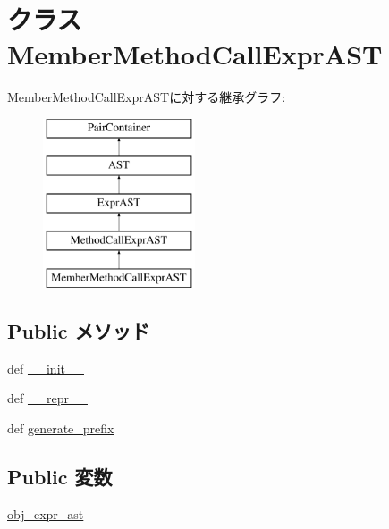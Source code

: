 \hypertarget{classslicc_1_1ast_1_1MethodCallExprAST_1_1MemberMethodCallExprAST}{
\section{クラス MemberMethodCallExprAST}
\label{classslicc_1_1ast_1_1MethodCallExprAST_1_1MemberMethodCallExprAST}
}
MemberMethodCallExprASTに対する継承グラフ:\begin{figure}[H]
\begin{center}
\leavevmode
\includegraphics[height=5cm]{classslicc_1_1ast_1_1MethodCallExprAST_1_1MemberMethodCallExprAST}
\end{center}
\end{figure}
\subsection*{Public メソッド}
\begin{DoxyCompactItemize}
\item 
def \hyperlink{classslicc_1_1ast_1_1MethodCallExprAST_1_1MemberMethodCallExprAST_ac775ee34451fdfa742b318538164070e}{\_\-\_\-init\_\-\_\-}
\item 
def \hyperlink{classslicc_1_1ast_1_1MethodCallExprAST_1_1MemberMethodCallExprAST_ad8b9328939df072e4740cd9a63189744}{\_\-\_\-repr\_\-\_\-}
\item 
def \hyperlink{classslicc_1_1ast_1_1MethodCallExprAST_1_1MemberMethodCallExprAST_a706f9a281c5b0d05f80923a37adfa48e}{generate\_\-prefix}
\end{DoxyCompactItemize}
\subsection*{Public 変数}
\begin{DoxyCompactItemize}
\item 
\hyperlink{classslicc_1_1ast_1_1MethodCallExprAST_1_1MemberMethodCallExprAST_aa50d2ba9357360f10f6c566afe2a1d4b}{obj\_\-expr\_\-ast}
\end{DoxyCompactItemize}


